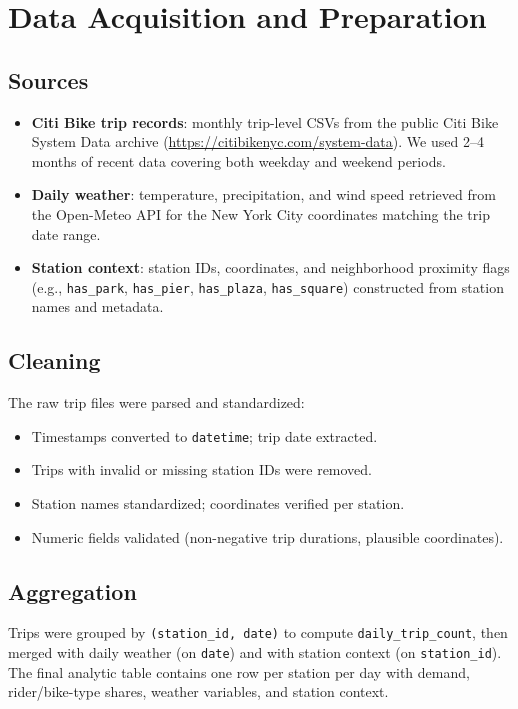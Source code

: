 \documentclass[11pt]{article}
\begin{document}
\section{Data Acquisition and Preparation}

\subsection{Sources}
\begin{itemize}[leftmargin=1.4em]
  \item \textbf{Citi Bike trip records}: monthly trip-level CSVs from the public
        Citi Bike System Data archive (\url{https://citibikenyc.com/system-data}).
        We used 2--4 months of recent data covering both weekday and weekend
        periods.
  \item \textbf{Daily weather}: temperature, precipitation, and wind speed
        retrieved from the Open-Meteo API for the New York City coordinates
        matching the trip date range.
  \item \textbf{Station context}: station IDs, coordinates, and neighborhood
        proximity flags (e.g., \texttt{has\_park}, \texttt{has\_pier},
        \texttt{has\_plaza}, \texttt{has\_square}) constructed from station
        names and metadata.
\end{itemize}

\subsection{Cleaning}
The raw trip files were parsed and standardized:
\begin{itemize}[leftmargin=1.4em]
  \item Timestamps converted to \texttt{datetime}; trip date extracted.
  \item Trips with invalid or missing station IDs were removed.
  \item Station names standardized; coordinates verified per station.
  \item Numeric fields validated (non-negative trip durations, plausible
        coordinates).
\end{itemize}

\subsection{Aggregation}
Trips were grouped by \texttt{(station\_id, date)} to compute
\texttt{daily\_trip\_count}, then merged with daily weather (on \texttt{date})
and with station context (on \texttt{station\_id}). The final analytic table
contains one row per station per day with demand, rider/bike-type shares,
weather variables, and station context.
\end{document}
